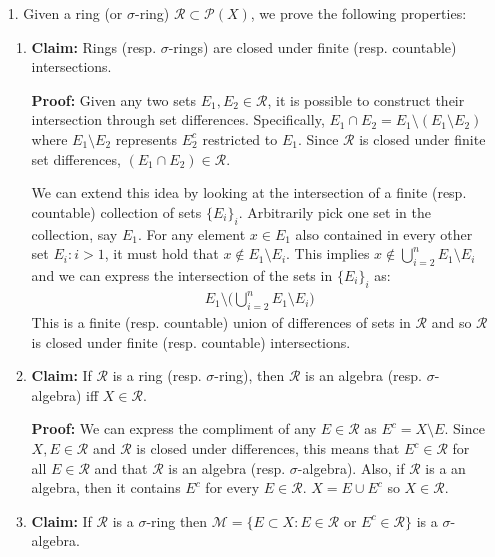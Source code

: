 \documentclass[11pt,letter]{article}
\begin{document}
\begin{enumerate}
    \item [1.] Given a ring (or $\sigma$-ring) $\mathcal{R} \subset \mathcal{P}(X)$, we prove the following properties:
    \begin{enumerate}
        \item \textbf{Claim:} Rings (resp. $\sigma$-rings) are closed under finite (resp. countable) intersections.

        \textbf{Proof:} Given any two sets $E_1, E_2 \in \mathcal{R}$, it is possible to construct their intersection through set differences. Specifically, $E_1 \cap E_2 = E_1 \setminus (E_1 \setminus E_2)$ where $E_1 \setminus E_2$ represents $E_2^c$ restricted to $E_1$. Since $\mathcal{R}$ is closed under finite set differences, $(E_1 \cap E_2 ) \in \mathcal{R}$.
        
        We can extend this idea by looking at the intersection of a finite (resp. countable) collection of sets $\{E_i\}_i$. Arbitrarily pick one set in the collection, say $E_1$. For any element $x \in E_1$ also contained in every other set $E_i: i > 1$, it must hold that $x \notin E_1 \setminus E_i$. This implies $x \notin \bigcup\limits_{i=2}^n E_1 \setminus E_i$ and we can express the intersection of the sets in $\{E_i\}_i$ as:
        \begin{align*}
            E_1 \setminus \Big( \bigcup\limits_{i=2}^n E_1 \setminus E_i \Big)
        \end{align*}
        This is a finite (resp. countable) union of differences of sets in $\mathcal{R}$ and so $\mathcal{R}$ is closed under finite (resp. countable) intersections.

        \item \textbf{Claim:} If $\mathcal{R}$ is a ring (resp. $\sigma$-ring), then $\mathcal{R}$ is an algebra (resp. $\sigma$-algebra) iff $X \in \mathcal{R}$.

        \textbf{Proof:} We can express the compliment of any $E \in \mathcal{R}$ as $E^c = X \setminus E$. Since $X, E \in \mathcal{R}$ and $\mathcal{R}$ is closed under differences, this means that $E^c \in \mathcal{R}$ for all $E \in \mathcal{R}$ and that $\mathcal{R}$ is an algebra (resp. $\sigma$-algebra). Also, if $\mathcal{R}$ is a an algebra, then it contains $E^c$ for every $E \in \mathcal{R}$. $X = E \cup E^c$ so $X \in \mathcal{R}$.

        \item \textbf{Claim:} If $\mathcal{R}$ is a $\sigma$-ring then $\mathcal{M} = \{E \subset X : E \in \mathcal{R} \text{ or } E^c \in \mathcal{R}\}$ is a $\sigma$-algebra.


\end{enumerate}
\end{enumerate}
\end{document}
